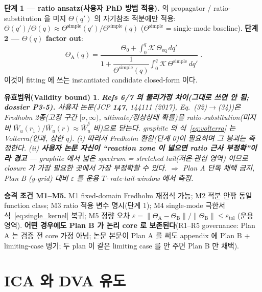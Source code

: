 \documentclass[11pt,a4paper]{article}
\newtheorem*{boundbox}{유효범위(Validity bound)}
\newcommand{\eq}{\mathrm{eq}}
\newcommand{\simplecase}{\mathrm{simple}}
\begin{document}
\textbf{단계 1 — ratio ansatz(사용자 PhD 방법 적용).} \cite{lee2011,son2013} 의 propagator /
ratio-substitution 을 미지 $\Theta(q')$ 의 자기참조 적분에만 적용:
$\Theta(q')/\Theta(q)\approx\Theta^\simplecase(q')/\Theta^\simplecase(q)$ ($\Theta^\simplecase$ = single-mode
baseline). \textbf{단계 2 — $\Theta(q)$ factor out}:
\begin{equation}
\boxed{\;\Theta_\mathrm A(q)=\frac{\Theta_0+\displaystyle\int_0^q\mathcal K\,\Theta_\eq\,dq'}
{1+\dfrac{1}{\Theta^\simplecase(q)}\displaystyle\int_0^q\mathcal K\,\Theta^\simplecase\,dq'}\;.}
\label{eq:closed}
\end{equation}
이것이 fitting 에 쓰는 instantiated candidate closed-form 이다.
\begin{boundbox}
\textbf{Refs 6/7 의 물리가정 차이(그대로 쓰면 안 됨; dossier P3-5).} 사용자 논문(\emph{JCP} \textbf{147},
144111 (2017), Eq.\ (32)$\to$(34))은 \emph{Fredholm} 2종(고정 구간 $[\sigma,\infty)$, ultimate/정상상태
확률)을 ratio-substitution(미지 비 $\bar W_u(r_1)/\bar W_u(r)\approx\bar W_u^\delta$ 비)으로 닫는다.
graphite 의 식~\eqref{eq:volterra} 는 \emph{Volterra}(인과, 상한 $q$). (i) 따라서 Fredholm 환원(단계 0)이
필요하며 그 붕괴는 측정한다. (ii) \textbf{사용자 논문 자신이 ``reaction zone 이 넓으면 ratio 근사
부정확''이라 경고} — graphite 에서 \emph{넓은 spectrum = stretched tail(저온$\cdot$관심 영역)} 이므로
closure 가 가장 필요한 곳에서 가장 부정확할 수 있다. $\Rightarrow$ Plan A 단독 채택 금지, Plan B
(g-grid) 대비 $\varepsilon$ 를 운용 $T\cdot$rate$\cdot$tail-window 에서 측정.
\end{boundbox}
\textbf{승격 조건 M1--M5.} M1 fixed-domain Fredholm 재정식 가능; M2 적분 안팎 동일 function class;
M3 ratio 적용 변수 명시(단계 1); M4 single-mode 극한서 식~\eqref{eq:single_kernel} 복귀; M5 정량 오차
$\varepsilon=\lVert\Theta_\mathrm A-\Theta_\mathrm B\rVert/\lVert\Theta_\mathrm B\rVert\le\varepsilon_\mathrm{tol}$
(운용 영역). \textbf{어떤 경우에도 Plan B 가 논리 core 로 보존된다}(R1--R5 governance: Plan A 는 검증 전
core 가정 아님; 논문 본문이 Plan A 를 써도 appendix 에 Plan B + limiting-case 병기; 두 plan 이 같은
limiting case 를 안 주면 Plan B 만 채택).

\section{ICA 와 DVA 유도}\label{sec:ica}
\end{document}
